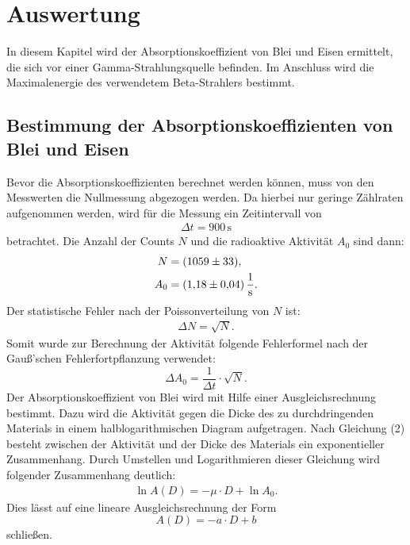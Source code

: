 \section{Auswertung}
\label{sec:Auswertung}
In diesem Kapitel wird der Absorptionskoeffizient von Blei und Eisen ermittelt, die sich vor einer Gamma-Strahlungsquelle befinden. Im Anschluss
wird die Maximalenergie des verwendetem Beta-Strahlers bestimmt.

\subsection{Bestimmung der Absorptionskoeffizienten von Blei und Eisen}
Bevor die Absorptionskoeffizienten berechnet werden können, muss von den Messwerten die Nullmessung abgezogen werden. Da hierbei nur geringe Zählraten
aufgenommen werden, wird für die Messung ein Zeitintervall von
\begin{align*}
\Delta t = 900\,\si{\second}
\end{align*}
betrachtet. Die Anzahl der Counts $N$ und die radioaktive Aktivität $A_0$ sind dann:
\begin{align*}
N &= (\num{1059 +- 33}), \\
A_0 &= (\num{1,18 +- 0,04})\,\frac{1}{\si{\second}}.
\end{align*}
Der statistische Fehler nach der Poissonverteilung von $N$ ist:
\begin{align*}
  \Delta N = \sqrt{N}.
\end{align*}
Somit wurde zur Berechnung der Aktivität folgende Fehlerformel nach der Gauß'schen Fehlerfortpflanzung verwendet:
\begin{equation}
\Delta A_0 = \frac{1}{\Delta t} \cdot \sqrt{N}.
\end{equation}
Der Absorptionskoeffizient von Blei wird mit Hilfe einer Ausgleichsrechnung bestimmt. Dazu wird die Aktivität gegen die Dicke des zu durchdringenden Materials
in einem halblogarithmischen Diagram aufgetragen. Nach Gleichung (2) besteht zwischen der Aktivität und der Dicke des Materials ein exponentieller
Zusammenhang. Durch Umstellen und Logarithmieren dieser Gleichung wird folgender Zusammenhang deutlich:
\begin{align*}
\ln{A(D)} = - \mu \cdot D + \ln{A_0}.
\end{align*}
Dies lässt auf eine lineare Ausgleichsrechnung der Form
\begin{equation}
\label{eqn:ausgleich1}
A(D) = - a \cdot D + b
\end{equation}
schließen.
